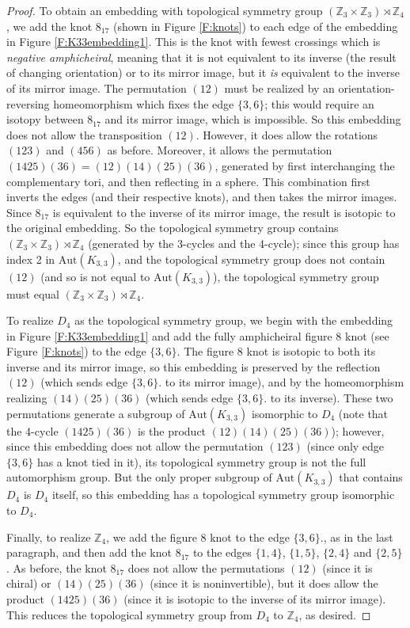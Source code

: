 \documentclass[11]{amsart}
\def\Z{\mathbb{Z}}
\newcommand{\semi}{{\rtimes}}
\def\Aut{{\mathrm{Aut}}}
\theoremstyle{definition}
\theoremstyle{remark}
\begin{document}
\begin{proof}
To obtain an embedding with topological symmetry group $(\Z_3 \times \Z_3) \semi \Z_4$, we add the knot $8_{17}$ (shown in Figure \ref{F:knots}) to each edge of the embedding in Figure \ref{F:K33embedding1}.  This is the knot with fewest crossings which is {\em negative amphicheiral}, meaning that it is not equivalent to its inverse (the result of changing orientation) or to its mirror image, but it {\em is} equivalent to the inverse of its mirror image. The permutation $(12)$ must be realized by an orientation-reversing homeomorphism which fixes the edge $\{3,6\}$; this would require an isotopy between $8_{17}$ and its mirror image, which is impossible.  So this embedding does not allow the transposition $(12)$.  However, it does allow the rotations $(123)$ and $(456)$ as before.  Moreover, it allows the permutation $(1425)(36) = (12)(14)(25)(36)$, generated by first interchanging the complementary tori, and then reflecting in a sphere. This combination first inverts the edges (and their respective knots), and then takes the mirror images.  Since $8_{17}$ is equivalent to the inverse of its mirror image, the result is isotopic to the original embedding.  So the topological symmetry group contains $(\Z_3 \times \Z_3) \semi \Z_4$ (generated by the 3-cycles and the 4-cycle); since this group has index 2 in $\Aut(K_{3,3})$, and the topological symmetry group does not contain $(12)$ (and so is not equal to $\Aut(K_{3,3})$), the topological symmetry group must equal $(\Z_3 \times \Z_3) \semi \Z_4$.

To realize $D_4$ as the topological symmetry group, we begin with the embedding in Figure \ref{F:K33embedding1} and add the fully amphicheiral figure 8 knot (see Figure \ref{F:knots}) to the edge $\{3,6\}$. The figure 8 knot is isotopic to both its inverse and its mirror image, so this embedding is preserved by the reflection $(12)$ (which sends edge $\{3,6\}$. to its mirror image), and by the homeomorphism realizing $(14)(25)(36)$ (which sends edge $\{3,6\}$. to its inverse). These two permutations generate a subgroup of $\Aut(K_{3,3})$ isomorphic to $D_4$ (note that the 4-cycle $(1425)(36)$ is the product $(12)(14)(25)(36)$); however, since this embedding does not allow the permutation $(123)$ (since only edge $\{3,6\}$ has a knot tied in it), its topological symmetry group is not the full automorphism group.  But the only proper subgroup of $\Aut(K_{3,3})$ that contains $D_4$ is $D_4$ itself, so this embedding has a topological symmetry group isomorphic to $D_4$.

Finally, to realize $\Z_4$, we add the figure 8 knot to the edge $\{3,6\}$., as in the last paragraph, and then add the knot $8_{17}$ to the edges $\{1,4\}$, $\{1,5\}$, $\{2,4\}$ and $\{2,5\}$.  As before, the knot $8_{17}$ does not allow the permutations $(12)$ (since it is chiral) or $(14)(25)(36)$ (since it is noninvertible), but it does allow the product $(1425)(36)$ (since it is isotopic to the inverse of its mirror image). This reduces the topological symmetry group from $D_4$ to $\Z_4$, as desired.
\end{proof}
\end{document}
